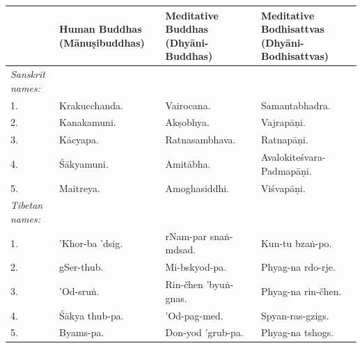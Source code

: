 \documentclass[a4paper, 12pt, oneside]{article}
\begin{document}
\begin{table}[H]
    \centering
    \bfseries
    \scriptsize
    \begin{tabular}{p{15mm}|p{24mm}|p{28mm}|p{29mm}}
        ~ &  \textbf{Human Buddhas (M\={a}nu\d{s}ibuddhas)}  &  \textbf{Meditative Buddhas (Dhy\={a}ni-Buddhas)}  &  \textbf{Meditative Bodhisattvas (Dhy\={a}ni-Bodhisattvas)}  \\ \hline
         \emph{Sanskrit names:}  & ~ & ~ & ~ \\ \hline
        1. &  Krakucchanda.                  &  Vairocana.                           &  Samantabhadra.                                 \\
        2. &  Kanakamuni.                    &  Ak\d{s}obhya.                            &  Vajrap\={a}\d{n}i.                                     \\
        3. &  K\={a}cyapa.                       &  Ratnasambhava.                       &  Ratnap\={a}\d{n}i.                                     \\
        4. &  \'{S}\={a}kyamuni.                     &  Amit\={a}bha.                            &  Avalokite\'{s}vara-Padmap\={a}\d{n}i.                      \\
        5. &  Maitreya.                      &  Amoghasiddhi.                        &  Vi\'{s}vap\={a}\d{n}i.                                     \\ \hline
         \emph{Tibetan names:}   & ~ & ~ & ~ \\ \hline
        1. &  'Khor-ba 'dsig.                &  rNam-par sna\.{n}-mdsad.                 &  Kun-tu bza\.{n}-po.                                \\
        2. &  gSer-thub.                     &  Mi-bskyod-pa.                        &  Phyag-na rdo-rje.                              \\
        3. &  'Od-sru\.{n}.                      &  Rin-čhen 'byu\.{n}-gnas.                 &  Phyag-na rin-čhen.                             \\
        4. &  \'{S}\={a}kya thub-pa.                 &  'Od-pag-med.                         &  Spyan-ras-gzigs.                               \\
        5. &  Byams-pa.                      &  Don-yod 'grub-pa.                    &  Phyag-na tshogs. \\
    \end{tabular}
\end{table}
\end{document}
